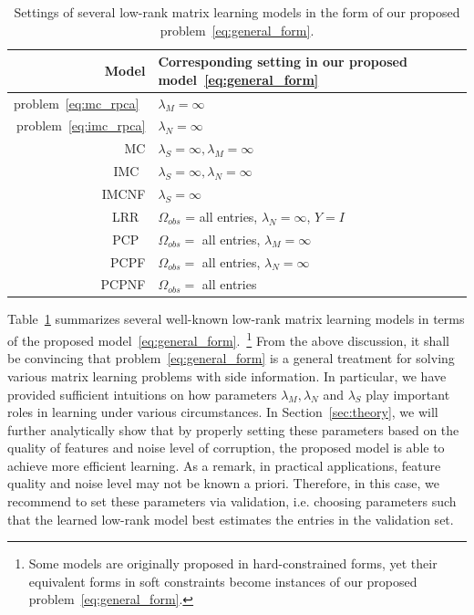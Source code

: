 \documentclass[twoside,11pt]{article}
\def\Obs{\Omega_{obs}}
\begin{document}
\begin{table}[tp]
\centering
\begin{tabular}{r|l}
  Model & Corresponding setting in our proposed model~\eqref{eq:general_form}\\ \hline
    problem~\eqref{eq:mc_rpca}~\citep{Candes11a} & $\lambda_M = \infty$\\
    problem~\eqref{eq:imc_rpca} & $\lambda_N = \infty$\\
    MC & $\lambda_S = \infty, \lambda_M = \infty$\\
    IMC~\citep{Jain13a} & $\lambda_S = \infty, \lambda_N = \infty$\\
    IMCNF & $\lambda_S = \infty$\\
    LRR~\citep{Liu13a} & $\Obs$ = all entries, $\lambda_N = \infty$, $Y = I$\\
    PCP~\citep{Candes11a} & $\Obs = $ all entries, $\lambda_M = \infty$\\
    PCPF & $\Obs = $ all entries, $\lambda_N = \infty$\\
    PCPNF & $\Obs = $ all entries\\
\end{tabular}
\caption{Settings of several low-rank matrix learning models in the form of
our proposed problem~\eqref{eq:general_form}.}
\label{tab:general_form}
\end{table}

Table~\ref{tab:general_form} summarizes several well-known low-rank matrix learning models
in terms of the proposed model~\eqref{eq:general_form}.~\footnote{Some models are originally proposed in hard-constrained forms,
yet their equivalent forms in soft constraints become instances of our proposed problem~\eqref{eq:general_form}.}
From the above discussion, it shall be convincing that problem~\eqref{eq:general_form}
is a general treatment for solving various matrix learning problems with side information.
In particular,
we have provided sufficient intuitions on how parameters $\lambda_M, \lambda_N$ and $\lambda_S$
play important roles in learning under various circumstances.
In Section~\ref{sec:theory},
we will further analytically show that by properly setting these parameters based on the quality of
features and noise level of corruption, the proposed model is able to achieve
more efficient learning.  As a remark,
in practical applications, feature quality and noise level may not be known a priori.
Therefore, in this case,
we recommend to set these parameters via validation, i.e. choosing
parameters such that the learned low-rank model
best estimates the entries in the validation set.
\end{document}
